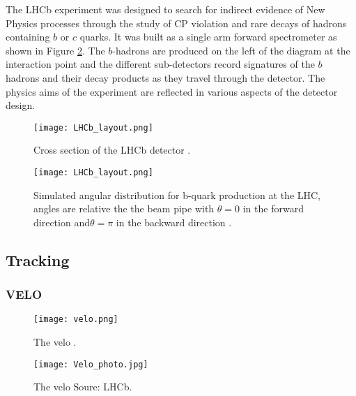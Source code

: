 

The LHCb experiment was designed to search for indirect evidence of New Physics processes through the study of CP violation and rare decays of hadrons containing $b$ or $c$ quarks. It was built as a single arm forward spectrometer as shown in Figure \ref{fig:LHCb_detector}. The $b$-hadrons are produced on the left of the diagram at the interaction point and the different sub-detectors record signatures of the $b$ hadrons and their decay products as they travel through the detector. The physics aims of the experiment are reflected in various aspects of the detector design. 




\begin{figure}[tb] 
  \centering    
  \texttt{[image: LHCb\_layout.png]}
  \caption{Cross section of the LHCb detector \cite{LHCb:2003ab}.}
  \label{fig:LHCb_detector}
\end{figure}




\begin{figure}[tb] 
  \centering    
  \texttt{[image: LHCb\_layout.png]}
  \caption{Simulated angular distribution for b-quark production at the LHC, angles are relative the the beam pipe with $\theta =0$ in the forward direction and$\theta = \pi$  in the backward direction \cite{Amato:1998xt}.}
  \label{fig:LHCb_detector}
\end{figure}


\subsection{Tracking}


\subsubsection{VELO}



\begin{figure}[tb] 
  \centering    
  \texttt{[image: velo.png]}
  \caption{The velo \cite{Alves:2008zz}.}
  \label{fig:velo}
\end{figure}

\begin{figure}[tb] 
  \centering    
  \texttt{[image: Velo\_photo.jpg]}
  \caption{The velo Soure: LHCb.}
  \label{fig:velo_photo}
\end{figure}

